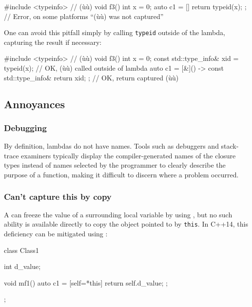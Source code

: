 \begin{emcppslisting}
#include <typeinfo>  // (ù{}ù)
void f3()
{
    int x = 0;
    auto c1 = []{ return typeid(x); };
        // Error, on some platforms ``(ù{}ù) was not captured''
}
\end{emcppslisting}
    

One can avoid this pitfall simply by calling \lstinline!typeid! outside of
the lambda, capturing the result if necessary:

\begin{emcppslisting}
#include <typeinfo>  // (ù{}ù)
void f3()
{
    int x = 0;
    const std::type_info& xid = typeid(x);  // OK, (ù{}ù) called outside of lambda
    auto c1 = [&]() -> const std::type_info&
    { return xid; };  // OK, return captured (ù{}ù)
}
\end{emcppslisting}
    

\subsection[Annoyances]{Annoyances}\label{annoyances}

\subsubsection[Debugging]{Debugging}\label{debugging}

By definition, lambdas do not have names. Tools such as debuggers and
stack-trace examiners typically display the compiler-generated names of
the closure types instead of names selected by the programmer to clearly
describe the purpose of a function, making it difficult to discern where
a problem occurred.

\subsubsection[Can’t capture \lstinline!*this! by copy]{Can’t capture {\SubsubsecCode *this} by copy}\label{can’t-capture-*this-by-copy}

A  can freeze the value of a surrounding local
variable by using , but no such ability is
available directly to copy the object pointed to by \lstinline!this!. In
C++14, this deficiency can be mitigated using :

\begin{emcppslisting}
class Class1
{
    int d_value;

    void mf1()
    {
        auto c1 = [self=*this]{ return self.d_value; };
    }
};
\end{emcppslisting}
    

